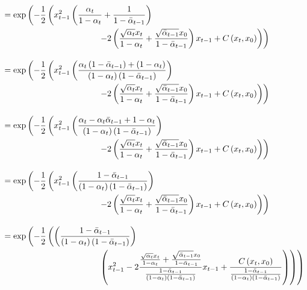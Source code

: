 \documentclass[twoside]{article}
\numberwithin{equation}{section}
\numberwithin{figure}{section}
\begin{document}
\begin{align}
  &= \exp\left(- \frac{1}{2} \left(x_{t-1}^2 \left(\frac{\alpha_t}{1 - \alpha_t} + \frac{1}{1 - \bar{\alpha}_{t-1}}\right) \right. \right. \\
  &\hspace{4cm} \left. \left. - 2\left(\frac{\sqrt{\alpha_t} x_t}{1 - \alpha_t} + \frac{\sqrt{\bar{\alpha}_{t-1}} x_0}{1 - \bar{\alpha}_{t-1}}\right) x_{t-1} + C\left(x_t, x_0\right) \right) \right) \notag \\[10pt]
  &= \exp\left(- \frac{1}{2} \left(x_{t-1}^2 \left(\frac{\alpha_t \left(1 - \bar{\alpha}_{t-1}\right) + \left(1 - \alpha_t\right)}{\left(1 - \alpha_t\right)\left(1 - \bar{\alpha}_{t-1}\right)}\right) \right. \right. \\
  &\hspace{4cm} \left. \left. - 2\left(\frac{\sqrt{\alpha_t} x_t}{1 - \alpha_t} + \frac{\sqrt{\bar{\alpha}_{t-1}} x_0}{1 - \bar{\alpha}_{t-1}}\right) x_{t-1} + C\left(x_t, x_0\right) \right) \right) \notag \\[10pt]
  &= \exp\left(- \frac{1}{2} \left(x_{t-1}^2 \left(\frac{\alpha_t - \alpha_t \bar{\alpha}_{t-1} + 1 - \alpha_t}{\left(1 - \alpha_t\right)\left(1 - \bar{\alpha}_{t-1}\right)}\right) \right. \right. \\
  &\hspace{4cm} \left. \left. - 2\left(\frac{\sqrt{\alpha_t} x_t}{1 - \alpha_t} + \frac{\sqrt{\bar{\alpha}_{t-1}} x_0}{1 - \bar{\alpha}_{t-1}}\right) x_{t-1} + C\left(x_t, x_0\right) \right) \right) \notag \\[10pt]
  &= \exp\left(- \frac{1}{2} \left(x_{t-1}^2 \left(\frac{1 - \bar{\alpha}_{t-1}}{\left(1 - \alpha_t\right)\left(1 - \bar{\alpha}_{t-1}\right)}\right) \right. \right. \\
  &\hspace{4cm} \left. \left. - 2\left(\frac{\sqrt{\alpha_t} x_t}{1 - \alpha_t} + \frac{\sqrt{\bar{\alpha}_{t-1}} x_0}{1 - \bar{\alpha}_{t-1}}\right) x_{t-1} + C\left(x_t, x_0\right) \right) \right) \notag \\[10pt]
  &= \exp\left(- \frac{1}{2} \left( \left(\frac{1 - \bar{\alpha}_{t-1}}{\left(1 - \alpha_t\right)\left(1 - \bar{\alpha}_{t-1}\right)}\right)  \right. \right. \\
  &\hspace{4cm} \left. \left. \left(x_{t-1}^2 - 2 \frac{\frac{\sqrt{\alpha_t}x_t}{1 - \alpha_t} + \frac{\sqrt{\bar{\alpha}_{t-1}} x_0}{1 - \bar{\alpha}_{t-1}}}{\frac{1 - \bar{\alpha}_{t-1}}{\left(1 - \alpha_t\right)\left(1 - \bar{\alpha}_{t-1}\right)}} x_{t-1} + \frac{C\left(x_t, x_0\right)}{\frac{1 - \bar{\alpha}_{t-1}}{\left(1 - \alpha_t\right)\left(1 - \bar{\alpha}_{t-1}\right)}}\right) \right) \right) \notag \\[10pt]

\end{align}
\end{document}
